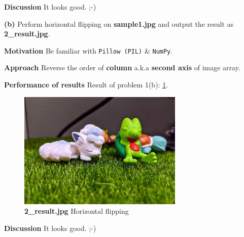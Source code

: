 \textbf{Discussion}
It looks good. ;-)


\textbf{(b)} Perform horizontal flipping on \textbf{sample1.jpg} and output the result as \textbf{2\_result.jpg}.

\textbf{Motivation}
Be familiar with \texttt{Pillow (PIL)} \& \texttt{NumPy}.

\textbf{Approach} 
Reverse the order of \textbf{column} a.k.a \textbf{second axis} of image array.

\textbf{Performance of results}
Result of problem 1(b): \cref{fig1b}.
\begin{figure}
    \centering
    \includegraphics[width=0.7\textwidth]{image/2_result.jpg}
    \caption{\textbf{2\_result.jpg} Horizontal flipping}
    \label{fig1b}
\end{figure}

\textbf{Discussion}
It looks good. ;-)

